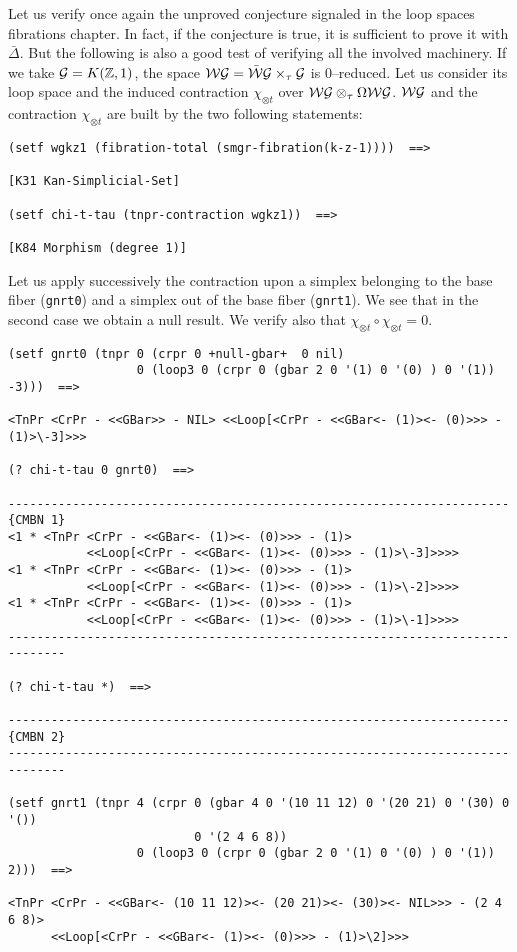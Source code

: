 \newpage
Let us verify once again the unproved conjecture signaled in the loop spaces fibrations
chapter. In fact, if the conjecture is true, it is sufficient to prove
it with $\bar{\Delta}$. But the following is also a good test of verifying all the
involved machinery. If we take ${\cal G}= K(\mathbb{Z},1)$, the space
${\cal WG}=\bar{\cal W}{\cal G} \times_\tau  {\cal G}$ is $0$--reduced. Let us consider
its loop space and the induced contraction $\chi_{\otimes t}$ over
${\cal WG} \otimes_\tau \Omega{\cal WG}$. ${\cal WG}$ and the contraction $\chi_{\otimes t}$
are  built by the two following statements:
{\footnotesize\begin{verbatim}
(setf wgkz1 (fibration-total (smgr-fibration(k-z-1))))  ==>

[K31 Kan-Simplicial-Set]

(setf chi-t-tau (tnpr-contraction wgkz1))  ==>

[K84 Morphism (degree 1)]
\end{verbatim}}
Let us apply successively the contraction upon  a simplex belonging to
the base fiber ({\tt gnrt0}) and a simplex out of the base fiber ({\tt gnrt1}).
We see that in the second case we obtain a null result. We verify also that
$\chi_{\otimes t}\circ \chi_{\otimes t}=0$.
{\footnotesize\begin{verbatim}
(setf gnrt0 (tnpr 0 (crpr 0 +null-gbar+  0 nil)
                  0 (loop3 0 (crpr 0 (gbar 2 0 '(1) 0 '(0) ) 0 '(1)) -3)))  ==>

<TnPr <CrPr - <<GBar>> - NIL> <<Loop[<CrPr - <<GBar<- (1)><- (0)>>> - (1)>\-3]>>>

(? chi-t-tau 0 gnrt0)  ==>

----------------------------------------------------------------------{CMBN 1}
<1 * <TnPr <CrPr - <<GBar<- (1)><- (0)>>> - (1)>
           <<Loop[<CrPr - <<GBar<- (1)><- (0)>>> - (1)>\-3]>>>>
<1 * <TnPr <CrPr - <<GBar<- (1)><- (0)>>> - (1)>
           <<Loop[<CrPr - <<GBar<- (1)><- (0)>>> - (1)>\-2]>>>>
<1 * <TnPr <CrPr - <<GBar<- (1)><- (0)>>> - (1)>
           <<Loop[<CrPr - <<GBar<- (1)><- (0)>>> - (1)>\-1]>>>>
------------------------------------------------------------------------------

(? chi-t-tau *)  ==>

----------------------------------------------------------------------{CMBN 2}
------------------------------------------------------------------------------

(setf gnrt1 (tnpr 4 (crpr 0 (gbar 4 0 '(10 11 12) 0 '(20 21) 0 '(30) 0 '())
                          0 '(2 4 6 8))
                  0 (loop3 0 (crpr 0 (gbar 2 0 '(1) 0 '(0) ) 0 '(1)) 2)))  ==>

<TnPr <CrPr - <<GBar<- (10 11 12)><- (20 21)><- (30)><- NIL>>> - (2 4 6 8)>
      <<Loop[<CrPr - <<GBar<- (1)><- (0)>>> - (1)>\2]>>>
\end{verbatim}}
